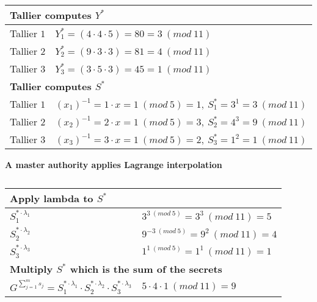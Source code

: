 \begin{table}[H]
\centering
\begin{tabular}{|l|l|}
\hline
\multicolumn{2}{|l|}{\textbf{Tallier computes $Y^*$}}                        \\ \hline
Tallier $1$ & $Y_1^* = (4 \cdot 4 \cdot 5) = 80 = 3 \ (mod \ 11)$                             \\ \hline
Tallier $2$ & $Y_2^* = (9 \cdot 3 \cdot 3) = 81 = 4 \ (mod \ 11)$                             \\ \hline
Tallier $3$ & $Y_3^* = (3 \cdot 5 \cdot 3) = 45 = 1 \ (mod \ 11)$                             \\ \hline
\multicolumn{2}{|l|}{\textbf{Tallier computes $S^*$}}                        \\ \hline
Tallier $1$ & $(x_1)^{-1} = 1 \cdot x = 1 \ (mod \ 5) = 1, \ S_1^* = 3^1 = 3 \ (mod \ 11)$ \\ \hline
Tallier $2$ & $(x_2)^{-1} = 2 \cdot x = 1 \ (mod \ 5) = 3, \ S_2^* = 4^3 = 9 \ (mod \ 11) $ \\ \hline
Tallier $3$ & $(x_3)^{-1} = 3 \cdot x = 1 \ (mod \ 5) = 2, \ S_3^* = 1^2 = 1 \ (mod \ 11) $ \\ \hline
\end{tabular}
\caption{}
\label{my-label}
\end{table}

\noindent
\textbf{A master authority applies Lagrange interpolation}\\

\begin{table}[H]
\centering
\begin{tabular}{|l|l|}
\hline
\multicolumn{2}{|l|}{\textbf{Apply lambda to $S^*$}}                                                                     \\ \hline
$S_1^{* \cdot \lambda_1}$                                            & $3^{3 \ (mod \ 5)} = 3^3 \ (mod \ 11) = 5$  \\ \hline
$S_2^{* \cdot \lambda_2}$                                            & $9^{-3 \ (mod \ 5)} = 9^2 \ (mod \ 11) = 4$ \\ \hline
$S_3^{* \cdot \lambda_3}$                                            & $1^{1 \ (mod \ 5)} = 1^1 \ (mod \ 11) = 1$  \\ \hline
\multicolumn{2}{|l|}{\textbf{Multiply $S^*$ which is the sum of the secrets}}                                                                            \\ \hline
$G^{ \sum\limits_{j=1}^m s_j} = S_1^{* \cdot \lambda_1} \cdot  S_2^{* \cdot \lambda_2} \cdot S_3^{* \cdot \lambda_3}$ & $5 \cdot 4 \cdot 1 \ (mod \ 11) = 9$  \\ \hline
\end{tabular}
\caption{}
\label{my-label}
\end{table}

